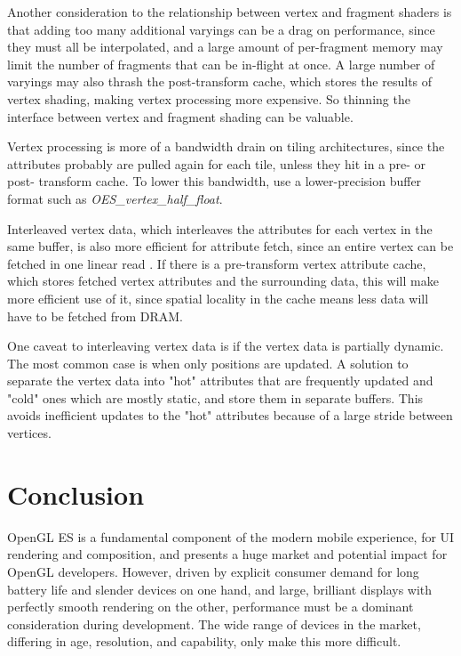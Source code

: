 Another consideration to the relationship between vertex and fragment shaders
is that adding too many additional varyings can be a drag on performance, since
they must all be interpolated, and a large amount of per-fragment memory may
limit the number of fragments that can be in-flight at once.  A large number of
varyings may also thrash the post-transform cache, which stores the results of
vertex shading, making vertex processing more expensive.  So thinning the
interface between vertex and fragment shading can be valuable.

Vertex processing is more of a bandwidth drain on tiling architectures, since
the attributes probably are pulled again for each tile, unless they hit in a
pre- or post- transform cache.  To lower this bandwidth, use a lower-precision
buffer format such as \textit{OES\_vertex\_half\_float}.

Interleaved vertex
 data, which interleaves the attributes for each vertex in
the same buffer, is
 also more efficient for attribute fetch, since an entire
vertex can be fetched
 in one linear read \cite{Apple11}.  If there is a
pre-transform vertex
 attribute cache, which stores fetched vertex attributes
and the surrounding
 data, this will make more efficient use of it, since
spatial locality in the
 cache means less data will have to be fetched from
DRAM.

One caveat to interleaving vertex data is if the vertex data is partially
dynamic.  The most common case is when only positions are updated.  A solution
to separate the vertex data into "hot" attributes that are frequently updated
and "cold" ones which are mostly static, and store them in separate buffers.
This avoids inefficient updates to the "hot" attributes because of a large
stride between vertices.

\section{Conclusion}\label{Jon-McCaffrey-Conclusion}

OpenGL ES is a fundamental component of the modern mobile experience, for UI
rendering and composition, \cite{Guy11} and presents a huge market and
potential impact for OpenGL developers.  However, driven by explicit consumer
demand for long battery life and slender devices on one hand, and large,
brilliant displays with perfectly smooth rendering on the other, performance
must be a dominant consideration during development.  The wide range of devices
in the market, differing in age, resolution, and capability, only make
this more difficult.

